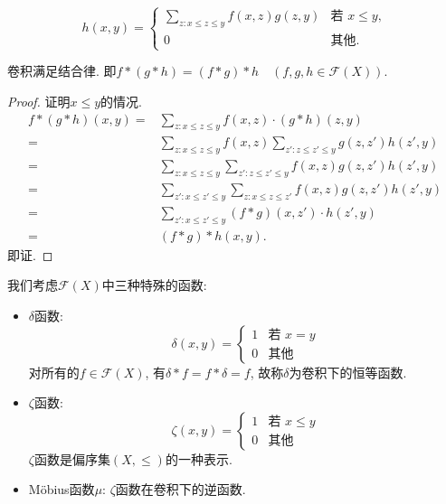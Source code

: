 \[ h(x, y) = \begin{cases}
        \sum_{z : x \leq z \leq y} f(x, z) g(z, y) & \text{若 } x \leq y, \\
        0                                          & \text{其他.}
    \end{cases} \]
\begin{lemma}\label{juanjijiehel}
    卷积满足结合律. 即$f * (g * h) = (f * g) * h \quad (f, g, h \in \mathcal{F}(X))$.
\end{lemma}
\begin{proof}证明$x\leq y$的情况.
    \begin{align*}
        f*(g*h)(x,y)= & \sum_{z:x\leq z\leq y}f(x,z)\cdot (g*h)(z,y)                        \\
        =             & \sum_{z:x\leq z\leq y}f(x,z)\sum_{z':z\leq z'\leq y}g(z,z')h(z',y)  \\
        =             & \sum_{z:x\leq z\leq y}\sum_{z':z\leq z'\leq y}f(x,z)g(z,z')h(z',y)  \\
        =             & \sum_{z':x\leq z'\leq y}\sum_{z:x\leq z\leq z'}f(x,z)g(z,z')h(z',y) \\
        =             & \sum_{z':x\leq z'\leq y}(f*g)(x,z')\cdot h(z',y)                    \\
        =             & (f * g) * h(x,y).
    \end{align*}
    即证.
\end{proof}

我们考虑$\mathcal{F}(X)$中三种特殊的函数:
\begin{itemize}
    \item $\delta$函数: $$\delta(x, y) =
              \begin{cases}
                  1 & \text{若 } x = y \\
                  0 & \text{其他}
              \end{cases}$$
          对所有的$f\in \mathcal{F}(X)$, 有$\delta*f=f*\delta=f$, 故称$\delta$为卷积下的恒等函数.
    \item $\zeta$函数: $$\zeta(x, y) =
              \begin{cases}
                  1 & \text{若 } x \leq y \\
                  0 & \text{其他}
              \end{cases}$$
          $\zeta$函数是偏序集$(X,\leq)$的一种表示.
    \item Möbius函数$\mu$: $\zeta$函数在卷积下的逆函数.
\end{itemize}


